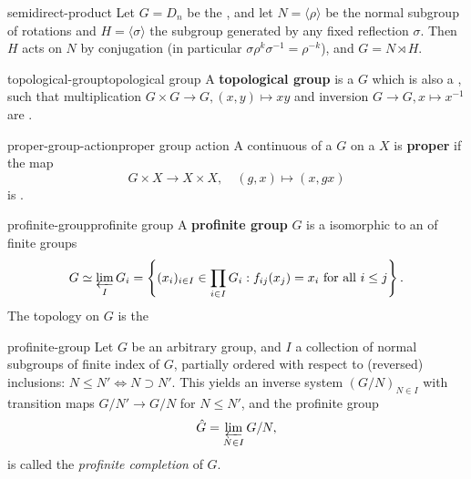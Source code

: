 \begin{example}{semidirect-product}
    Let $G = D_{n}$ be the , and let $N = \langle \rho \rangle$ be the normal subgroup of rotations and $H = \langle \sigma \rangle$ the subgroup generated by any fixed reflection $\sigma$. Then $H$ acts on $N$ by conjugation (in particular $\sigma \rho^k \sigma^{-1} = \rho^{-k}$), and $G = N \rtimes H$.
\end{example}


\begin{topic}{topological-group}{topological group}
    A \textbf{topological group} is a  $G$ which is also a , such that multiplication $G \times G \to G, (x, y) \mapsto xy$ and inversion $G \to G, x \mapsto x^{-1}$ are .
\end{topic}

\begin{topic}{proper-group-action}{proper group action}
    A continuous  of a  $G$ on a  $X$ is \textbf{proper} if the map
    \[ G \times X \to X \times X, \quad (g, x) \mapsto (x, gx) \]
    is .
\end{topic}

\begin{topic}{profinite-group}{profinite group}
    A \textbf{profinite group} $G$ is a  isomorphic to an  of  finite groups
    \[ G \simeq \varprojlim_I G_i = \left\{ (x_i)_{i \in I} \in \prod_{i \in I} G_i : f_{ij}(x_j) = x_i \text{ for all } i \le j \right\} . \]
    The topology on $G$ is the  
\end{topic}

\begin{example}{profinite-group}
    Let $G$ be an arbitrary group, and $I$ a collection of normal subgroups of finite index of $G$, partially ordered with respect to (reversed) inclusions: $N \le N' \iff N \supset N'$. This yields an inverse system $(G / N)_{N \in I}$ with transition maps $G/N' \to G/N$ for $N \le N'$, and the profinite group
    \[ \hat{G} = \varprojlim_{N \in I} G / N ,\]
    is called the \textit{profinite completion} of $G$.
\end{example}
